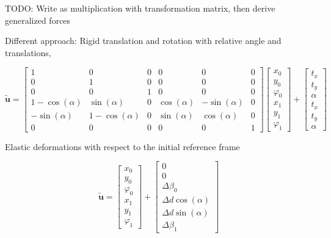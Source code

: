 TODO: Write as multiplication with transformation matrix, then derive generalized forces

\newpage

Different approach: Rigid translation and rotation with relative angle and translations,

\begin{equation}
\renewcommand\arraystretch{1.5}
\tilde{\boldsymbol{u}} = \begin{bmatrix}
1 & 0 & 0 & 0 & 0 & 0 \\
0 & 1 & 0 & 0 & 0 & 0 \\
0 & 0 & 1 & 0 & 0 & 0 \\
1-\cos(\alpha) & \sin(\alpha) & 0 & \cos(\alpha) & -\sin(\alpha) & 0 \\
-\sin(\alpha) & 1-\cos(\alpha) & 0 & \sin(\alpha) & \cos(\alpha) & 0 \\
0 & 0 & 0 & 0 & 0 & 1
\end{bmatrix}
\begin{bmatrix}
x_0 \\
y_0 \\
\varphi_0 \\
x_1 \\
y_1 \\
\varphi_1
\end{bmatrix}
+
\begin{bmatrix}
t_x \\
t_y \\
\alpha \\
t_x \\
t_y \\
\alpha
\end{bmatrix}
\end{equation}

Elastic deformations with respect to the initial reference frame

\begin{equation}
\renewcommand\arraystretch{1.5}
\tilde{\boldsymbol{u}} = \begin{bmatrix}
x_0 \\
y_0 \\
\varphi_0 \\
x_1 \\
y_1 \\
\varphi_1
\end{bmatrix}
+
\begin{bmatrix}
0 \\
0 \\
\Delta\beta_0 \\
\Delta d \cos(\alpha) \\
\Delta d \sin(\alpha) \\
\Delta \beta_1
\end{bmatrix}
\end{equation}

